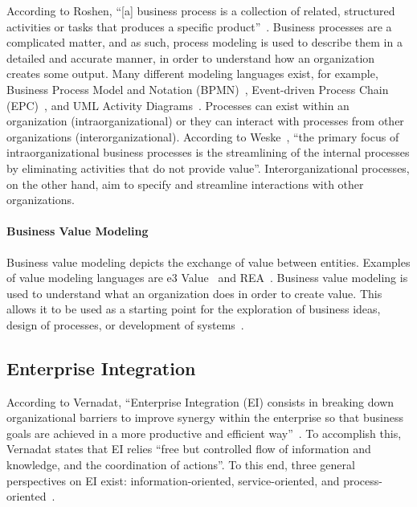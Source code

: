 According to Roshen, ``[a] business process is a collection of related, structured activities or tasks that produces a specific product''~\cite{roshen2009soa}. Business processes are a complicated matter, and as such, process modeling is used to describe them in a detailed and accurate manner, in order to understand how an organization creates some output. Many different modeling languages exist, for example, Business Process Model and Notation (BPMN)~\cite{model2011notation}, Event-driven Process Chain (EPC)~\cite[Ch. 6]{scheer2005process}, and UML Activity Diagrams~\cite{uml241}. Processes can exist within an organization (intraorganizational) or they can interact with processes from other organizations (interorganizational). According to Weske~\cite{weske2012business}, ``the primary focus of intraorganizational business processes is the streamlining of the internal processes by eliminating activities that do not provide value''. Interorganizational processes, on the other hand, aim to specify and streamline interactions with other organizations. 

\paragraph*{Business Value Modeling}

Business value modeling depicts the exchange of value between entities. Examples of value modeling languages are e3 Value~\cite{Gordijn2001e3value} and REA~\cite{pavel2006model}. Business value modeling is used to understand what an organization does in order to create value. This allows it to be used as a starting point for the exploration of business ideas, design of processes, or development of systems~\cite{johannesson2011lecture}.

\subsection{Enterprise Integration}

According to Vernadat, ``Enterprise Integration (EI) consists in breaking down organizational barriers to improve synergy within the enterprise so that business goals are achieved in a more productive and efficient way''~\cite{Vernadat200215}. To accomplish this, Vernadat states that EI relies ``free but controlled flow of information and knowledge, and the coordination of actions''. To this end, three general perspectives on EI exist: information-oriented, service-oriented, and process-oriented~\cite{zdravkovic2012}.

